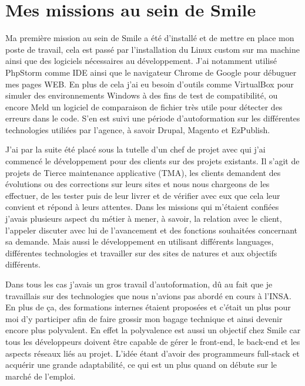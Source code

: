 \documentclass[a4paper,11pt,twoside]{report}
\begin{document}
  \section{Mes missions au sein de Smile}
  Ma première mission au sein de Smile a été d'installé et de mettre en place mon poste de travail, cela est passé par l'installation du Linux custom sur ma machine ainsi que des logiciels nécessaires au développement. J'ai notamment utilisé PhpStorm comme IDE ainsi que le navigateur Chrome de Google pour débuguer mes pages WEB. En plus de cela j'ai eu besoin d'outils comme VirtualBox pour simuler des environnements Windows à des fins de test de compatibilité, ou encore Meld un logiciel de comparaison de fichier très utile pour détecter des erreurs dans le code. S'en est suivi une période d'autoformation sur les différentes technologies utiliées par l'agence, à savoir Drupal, Magento et EzPublish.\newline 
  
  J'ai par la suite été placé sous la tutelle d'un chef de projet avec qui j'ai commencé le développement pour des clients sur des projets existants. Il s'agit de projets de Tierce maintenance applicative (TMA), les clients demandent des évolutions ou des corrections sur leurs sites et nous nous chargeons de les effectuer, de les tester puis de leur livrer et de vérifier avec eux que cela leur convient et répond à leurs attentes. Dans les missions qui m'étaient confiées j'avais plusieurs aspect du métier à mener, à savoir, la relation avec le client, l'appeler discuter avec lui de l'avancement et des fonctions souhaitées concernant sa demande. Mais aussi le développement en utilisant différents languages, différentes technologies et travailler sur des sites de natures et aux objectifs différents.\newline 
  
  Dans tous les cas j'avais un gros travail d'autoformation, dû au fait que je travaillais sur des technologies que nous n'avions pas abordé en cours à l'INSA. En plus de ça, des formations internes étaient proposées et c'était un plus pour moi d'y participer afin de faire grossir mon bagage technique et ainsi devenir encore plus polyvalent. En effet la polyvalence est aussi un objectif chez Smile car tous les développeurs doivent être capable de gérer le front-end, le back-end et les aspects réseaux liés au projet. L'idée étant d'avoir des programmeurs full-stack et acquérir une grande adaptabilité, ce qui est un plus quand on débute sur le marché de l'emploi.
  
\end{document}
